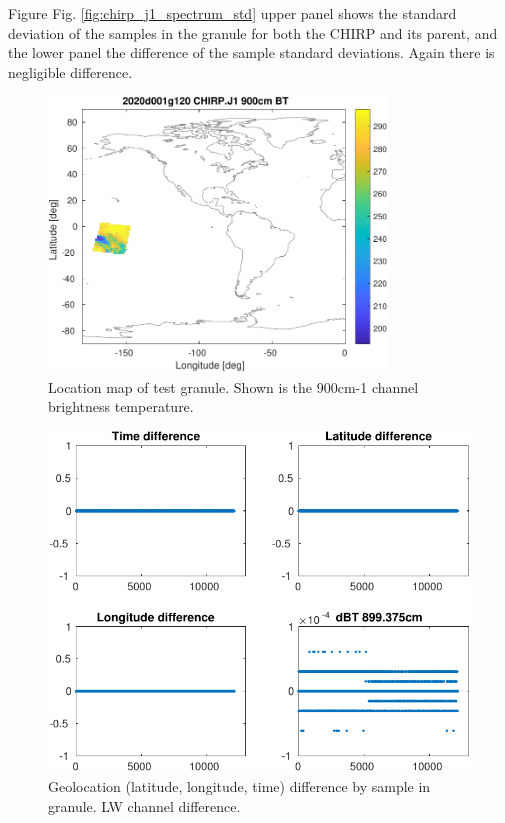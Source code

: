 \documentclass[11pt]{article}
\begin{document}
Figure Fig. \ref{fig:chirp_j1_spectrum_std} upper panel shows the standard deviation of the samples in the granule for both the CHIRP and its parent, and the lower panel the difference of the sample standard deviations. Again there is negligible difference.

\begin{figure}[htbp]
\centering
\includegraphics[angle=0,width=9cm]{./figs/2020d001g120_chirp_j1_900cn_bt_map.pdf}
\caption{\label{fig:org3e68524}
Location map of test granule. Shown is the 900cm-1 channel brightness temperature.}
\end{figure}

\begin{figure}[htbp]
\centering
\includegraphics[width=.9\linewidth]{./figs/2020d001g120_chirp_j1_geo_diff.pdf}
\caption{\label{fig:org74d4dde}
Geolocation (latitude, longitude, time) difference by sample in granule. LW channel difference.}
\end{figure}
\end{document}
